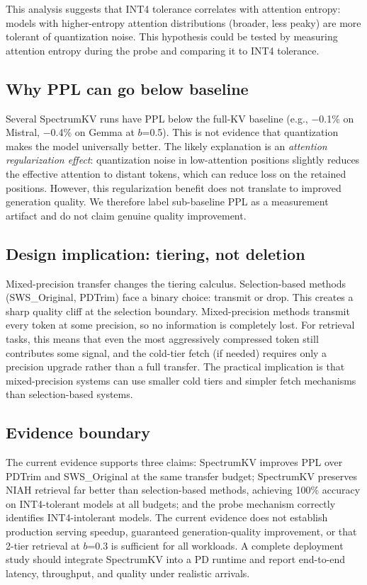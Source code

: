 \documentclass[11pt]{article}
\newcommand{\method}{SpectrumKV}
\newcommand{\pct}{\%}
\theoremstyle{definition}
\theoremstyle{plain}
\begin{document}
This analysis suggests that INT4 tolerance correlates with attention entropy: models with higher-entropy attention distributions (broader, less peaky) are more tolerant of quantization noise.  This hypothesis could be tested by measuring attention entropy during the probe and comparing it to INT4 tolerance.

\subsection{Why PPL can go below baseline}
Several \method{} runs have PPL below the full-KV baseline (e.g., $-$0.1\pct{} on Mistral, $-$0.4\pct{} on Gemma at $b$=0.5).  This is not evidence that quantization makes the model universally better.  The likely explanation is an \emph{attention regularization effect}: quantization noise in low-attention positions slightly reduces the effective attention to distant tokens, which can reduce loss on the retained positions.  However, this regularization benefit does not translate to improved generation quality.  We therefore label sub-baseline PPL as a measurement artifact and do not claim genuine quality improvement.

\subsection{Design implication: tiering, not deletion}
Mixed-precision transfer changes the tiering calculus.  Selection-based methods (SWS\_Original, PDTrim) face a binary choice: transmit or drop.  This creates a sharp quality cliff at the selection boundary.  Mixed-precision methods transmit every token at some precision, so no information is completely lost.  For retrieval tasks, this means that even the most aggressively compressed token still contributes some signal, and the cold-tier fetch (if needed) requires only a precision upgrade rather than a full transfer.  The practical implication is that mixed-precision systems can use smaller cold tiers and simpler fetch mechanisms than selection-based systems.

\subsection{Evidence boundary}
The current evidence supports three claims: \method{} improves PPL over PDTrim and SWS\_Original at the same transfer budget; \method{} preserves NIAH retrieval far better than selection-based methods, achieving 100\pct{} accuracy on INT4-tolerant models at all budgets; and the probe mechanism correctly identifies INT4-intolerant models.  The current evidence does not establish production serving speedup, guaranteed generation-quality improvement, or that 2-tier retrieval at $b$=0.3 is sufficient for all workloads.  A complete deployment study should integrate \method{} into a PD runtime and report end-to-end latency, throughput, and quality under realistic arrivals.
\end{document}
